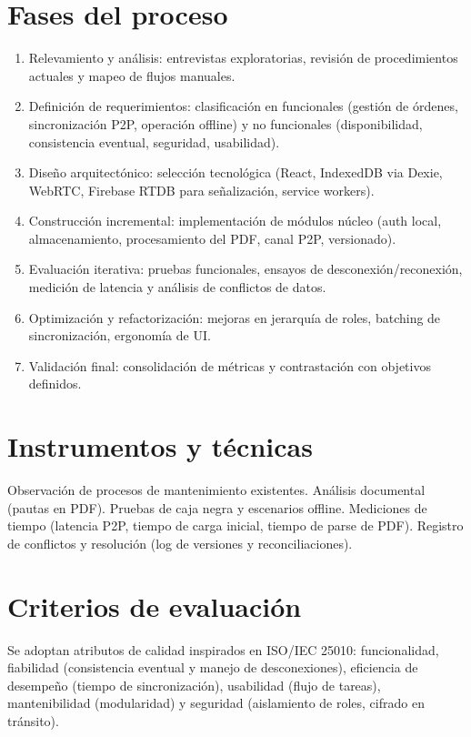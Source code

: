 \documentclass[12pt,a4paper]{report}
\begin{document}
\section*{Fases del proceso} 
\begin{enumerate} 
    \item Relevamiento y análisis: entrevistas exploratorias, revisión de procedimientos actuales y mapeo de flujos manuales. 
    
    \item Definición de requerimientos: clasificación en funcionales (gestión de órdenes, sincronización P2P, operación offline) y no funcionales (disponibilidad, consistencia eventual, seguridad, usabilidad). 

    \item Diseño arquitectónico: selección tecnológica (React, IndexedDB via Dexie, WebRTC, Firebase RTDB para señalización, service workers). 

    \item Construcción incremental: implementación de módulos núcleo (auth local, almacenamiento, procesamiento del PDF, canal P2P, versionado). 

    \item Evaluación iterativa: pruebas funcionales, ensayos de desconexión/reconexión, medición de latencia y análisis de conflictos de datos. 

    \item Optimización y refactorización: mejoras en jerarquía de roles, batching de sincronización, ergonomía de UI. 

    \item Validación final: consolidación de métricas y contrastación con objetivos definidos. 
\end{enumerate}

\section*{Instrumentos y técnicas}

Observación de procesos de mantenimiento existentes.
Análisis documental (pautas en PDF).
Pruebas de caja negra y escenarios offline.
Mediciones de tiempo (latencia P2P, tiempo de carga inicial, tiempo de parse de PDF).
Registro de conflictos y resolución (log de versiones y reconciliaciones).

\section*{Criterios de evaluación} Se adoptan atributos de calidad inspirados en ISO/IEC 25010\cite{iso25010:2011}: funcionalidad, fiabilidad (consistencia eventual y manejo de desconexiones), eficiencia de desempeño (tiempo de sincronización), usabilidad (flujo de tareas), mantenibilidad (modularidad) y seguridad (aislamiento de roles, cifrado en tránsito).
\end{document}
